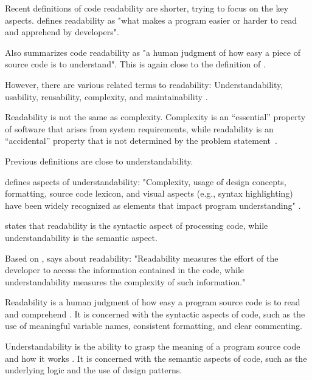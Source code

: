 \documentclass[%
class=scrreprt,
chapterprefix=false,%
open=right,%
twoside=false,%
paper=a4,%
logofile={Logo\_zentral\_farbig\_EN.png},%
thesistype=master,%
UKenglish,%
]{se2thesis}
\begin{document}
	Recent definitions of code readability are shorter, trying to focus on the key aspects. \citeauthor{oliveira2020evaluating} defines readability as "what makes a program easier or harder to read and apprehend by developers".
			
	Also \citeauthor{mi2021effectiveness} summarizes code readability as "a human judgment of how easy a piece of
	source code is to understand". This is again close to the definition of \citeauthor{buse2009learning}.
	
	However, there are various related terms to readability: Understandability, usability, reusability, complexity, and maintainability \citeauthor{tashtoush2013impact}. 
	
	Readability is not the same as complexity. Complexity is an “essential” property of software that arises
	from system requirements, while readability is an “accidental” property that is not determined by the problem statement~\cite{buse2009learning, brooks1987no}.
	
	Previous definitions are close to understandability.
	
	\citeauthor{scalabrino2018comprehensive} defines aspects of understandability: "Complexity, usage of design concepts, formatting, source code lexicon, and visual aspects (e.g., syntax highlighting) have been widely recognized as elements that impact program understanding" \cite{martin2009clean, wilson2007beautiful, beck2007implementation}.
	
	\citeauthor{posnett2011simpler} states that readability is the syntactic aspect of processing code, while understandability is the semantic aspect.
	
	Based on \citeauthor{posnett2011simpler}, \citeauthor{scalabrino2018comprehensive} says about readability: "Readability measures the effort of the developer to access the information contained in the code, while understandability measures the complexity of such information."
	
	Readability is a human judgment of how easy a program source code is to read and comprehend \cite{buse2008evaluating, sedano2016code}. It is concerned with the syntactic aspects of code, such as the use of meaningful variable names, consistent formatting, and clear commenting.
	
	Understandability is the ability to grasp the meaning of a program source code and how it works \cite{oliveira2020evaluating, posnett2011simpler}. It is concerned with the semantic aspects of code, such as the underlying logic and the use of design patterns.
	
\end{document}
